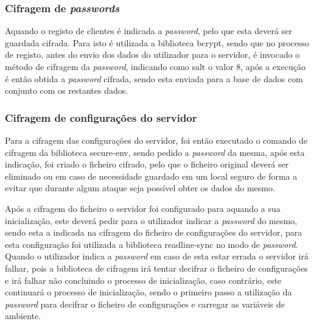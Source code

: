 \subsubsection{Cifragem de \textit{passwords}}
Aquando o registo de clientes é indicada a \textit{password}, pelo que esta deverá ser guardada cifrada. Para isto é utilizada a biblioteca bcrypt, sendo que no processo de registo, antes do envio dos dados do utilizador para o servidor, é invocado o método de cifragem da \textit{password}, indicando como salt o valor 8, após a execução é então obtida a \textit{password} cifrada, sendo esta enviada para a base de dados com conjunto com os restantes dados.

\subsubsection{Cifragem de configurações do servidor}
Para a cifragem das configurações do servidor, foi então executado o comando de cifragem da biblioteca secure-env, sendo pedido a \textit{password} da mesma, após esta indicação, foi criado o ficheiro cifrado, pelo que o ficheiro original deverá ser eliminado ou em caso de necessidade guardado em um local seguro de forma a evitar que durante algum ataque seja possível obter os dados do mesmo.

Após a cifragem do ficheiro o servidor foi configurado para aquando a sua inicialização, este deverá pedir para o utilizador indicar a \textit{password} do mesmo, sendo esta a indicada na cifragem do ficheiro de configurações do servidor, para esta configuração foi utilizada a biblioteca readline-sync no modo de \textit{password}. Quando o utilizador indica a \textit{password} em caso de esta estar errada o servidor irá falhar, pois a biblioteca de cifragem irá tentar decifrar o ficheiro de configurações e irá falhar não concluindo o processo de inicialização, caso contrário, este continuará o processo de inicialização, sendo o primeiro passo a utilização da \textit{password} para decifrar o ficheiro de configurações e carregar as variáveis de ambiente.